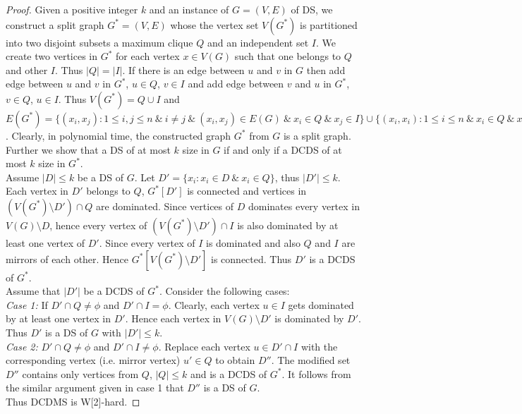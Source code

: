 \begin{proof}
Given a positive integer $k$ and an instance of $G=(V,E)$ of DS, we construct a split graph $G^*=(V,E)$ whose the vertex set $V(G^*)$ is partitioned into two disjoint subsets a maximum clique $Q$ and an independent set $I$. We create two vertices in $G^*$ for each vertex $x \in V(G)$ such that one belongs to $Q$ and other $I$. Thus $|Q|=|I|$. If there is an edge between $u$ and $v$ in $G$ then add edge between $u$ and $v$ in $G^*$, $u \in Q$, $v \in I$ and add edge between $v$ and $u$ in $G^*$, $v \in Q$, $u \in I$. Thus $V(G^*)=Q \cup I$ and $E(G^*)=\lbrace (x_i,x_j): 1 \leq i,j \leq n ~\&~ i \neq j~\&~ (x_i, x_j) \in E(G)~\&~ x_i \in Q~\&~ x_j \in I \rbrace \cup \lbrace (x_i,x_i): 1 \leq i \leq n~\&~ x_i \in Q~\&~ x_i \in I \rbrace \cup \lbrace (x_i,x_j): 1 \leq i,j \leq n~\&~ i \neq j~\&~ (x_i,x_j) \in Q \rbrace  $. Clearly, in polynomial time, the constructed graph $G^*$  from $G$ is a split graph. Further we show that a DS of at most $k$ size in $G$ if and only if a DCDS of at most $k$ size in $G^*$.\\
Assume $|D| \leq k$ be a DS of $G$. Let $D' = \lbrace x_i: x_i \in D~\&~ x_i \in Q \rbrace $, thus $|D'| \leq k$. Each vertex in $D'$ belongs to $Q$, $G^*[D']$ is connected and vertices in $(V(G^*)\setminus D') \cap Q$ are dominated. Since vertices of $D$ dominates every vertex in $V(G)\setminus D$, hence every vertex of $(V(G^*)\setminus D') \cap I$ is also dominated by at least one vertex of $D'$. Since every vertex of $I$ is dominated and also $Q$ and $I$ are mirrors of each other. Hence $G^*[V(G^*) \setminus D']$ is connected. Thus $D'$ is a DCDS of $G^*$.\\
Assume that $|D'|$ be a DCDS of $G^*$. Consider the following cases:\\
\textit{Case 1:} If $D' \cap Q \neq \phi$ and $D' \cap I = \phi$. Clearly, each vertex $u \in I$ gets dominated by at least one vertex in $D'$. Hence each vertex in $V(G) \setminus D'$ is dominated by $D'$. Thus $D'$ is a DS of $G$ with $|D'| \leq k$.\\
\textit{Case 2:} $D' \cap Q \neq \phi$ and $D' \cap I \neq \phi$. Replace each vertex $u \in D' \cap I$ with the corresponding vertex (i.e. mirror vertex) $u' \in Q$ to obtain $D''$. The modified set $D''$ contains only vertices from $Q$, $|Q| \leq k$ and is a DCDS of $G^*$. It follows from the similar argument given in case 1 that $D''$ is a DS of $G$.\\
Thus DCDMS is W[2]-hard.
\end{proof}

